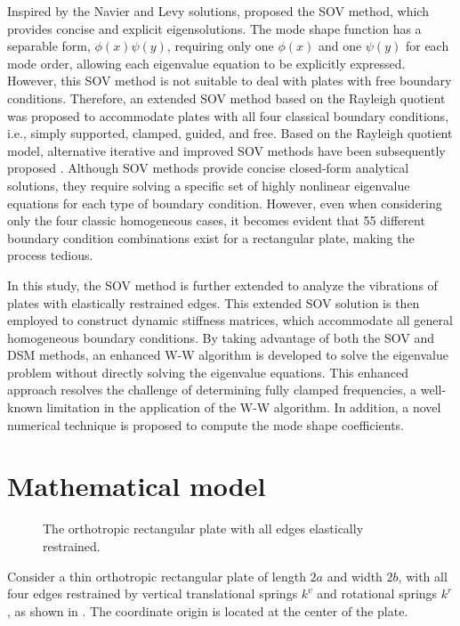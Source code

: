 \documentclass[preprint,12pt]{elsarticle}
\begin{document}
Inspired by the Navier and Levy solutions, \citet{xing2009new} proposed the SOV method, which provides concise and explicit eigensolutions.
The mode shape function has a separable form, $\phi(x) \psi(y)$, requiring only one $\phi(x)$ and one $\psi(y)$ for each mode order, allowing each eigenvalue equation to be explicitly expressed.
However, this SOV method is not suitable to deal with plates with free boundary conditions.
Therefore, an extended SOV method \cite{xing2018overall, xing2020extended} based on the Rayleigh quotient was proposed to accommodate plates with all four classical boundary conditions, i.e., simply supported, clamped, guided, and free.
Based on the Rayleigh quotient model, alternative iterative and improved SOV methods have been subsequently proposed \cite{xing2020improved}.
Although SOV methods provide concise closed-form analytical solutions, they require solving a specific set of highly nonlinear eigenvalue equations for each type of boundary condition.
However, even when considering only the four classic homogeneous cases, it becomes evident that 55 different boundary condition combinations exist for a rectangular plate, making the process tedious.

In this study, the SOV method is further extended to analyze the vibrations of plates with elastically restrained edges.
This extended SOV solution is then employed to construct dynamic stiffness matrices, which accommodate all general homogeneous boundary conditions.
By taking advantage of both the SOV and DSM methods, an enhanced W-W algorithm is developed to solve the eigenvalue problem without directly solving the eigenvalue equations.
This enhanced approach resolves the challenge of determining fully clamped frequencies, a well-known limitation in the application of the  W-W algorithm.
In addition, a novel numerical technique is proposed to compute the mode shape coefficients.


\FloatBarrier
\section{Mathematical model}\label{sec:Mathematical model}
\begin{figure}[!htbp]
	\centering
	\resizebox{0.8\textwidth}{!}
	{
		
	}
	\caption{\small The orthotropic rectangular plate with all edges elastically restrained.} 
	\label{fig:platemode}
\end{figure}
Consider a thin orthotropic rectangular plate of length $2a$ and width $2b$, with all four edges restrained by vertical translational springs $k^v$ and rotational springs $k^r$, as shown in . 
The coordinate origin is located at the center of the plate.
\end{document}
